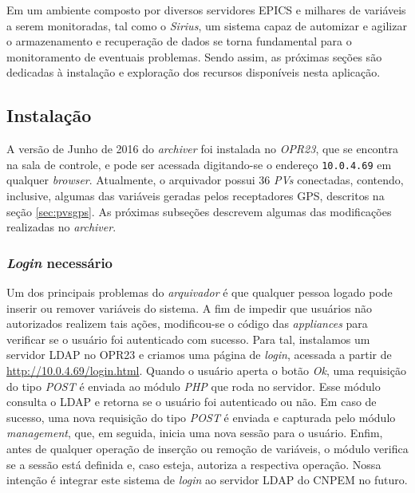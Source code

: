 \vspace{12pt}


Em um ambiente composto por diversos servidores EPICS e milhares de variáveis a
serem monitoradas, tal como o \textit{Sirius}, um sistema capaz de automizar e
agilizar o armazenamento e recuperação de dados se torna fundamental para o
monitoramento de eventuais problemas. Sendo assim, as próximas seções são
dedicadas à instalação e exploração dos recursos disponíveis nesta aplicação.

\subsection {Instalação}

A versão de Junho de 2016 do \textit{archiver} foi instalada no \textit{OPR23},
que se encontra na sala de controle, e pode ser acessada digitando-se o endereço
\texttt{10.0.4.69} em qualquer \textit{browser}. Atualmente, o arquivador possui
36 \textit{PVs} conectadas, contendo, inclusive, algumas das variáveis geradas
pelos receptadores GPS, descritos na seção \ref{sec:pvsgps}. As próximas
subseções descrevem algumas das modificações realizadas no \textit{archiver}.

\subsubsection{\textit{Login} necessário}

Um dos principais problemas do \textit{arquivador} é que qualquer pessoa logado
pode inserir ou remover variáveis do sistema. A fim de impedir que usuários não
autorizados realizem tais ações, modificou-se o código das
\textit{appliances} para verificar se o usuário foi autenticado com sucesso.
Para tal, instalamos um servidor LDAP no OPR23 e criamos uma página
de \textit{login}, acessada a partir de \url{http://10.0.4.69/login.html}. Quando o
usuário aperta o botão \textit{Ok}, uma requisição do tipo \textit{POST} é
enviada ao módulo \textit{PHP} que roda no servidor. Esse módulo consulta o LDAP
e retorna se o usuário foi autenticado ou não. Em caso de sucesso, uma nova
requisição do tipo \textit{POST} é enviada e capturada pelo módulo
\textit{management}, que, em seguida, inicia uma nova sessão para o usuário.
Enfim, antes de qualquer operação de inserção ou remoção de variáveis, o
módulo verifica se a sessão está definida e, caso esteja, autoriza a respectiva
operação. Nossa intenção é integrar este sistema de \textit{login} ao servidor
LDAP do CNPEM no futuro.

